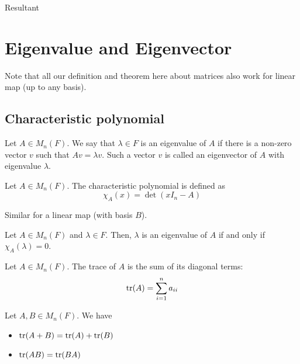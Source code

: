 \documentclass[11pt]{article}
\begin{document}
\begin{extension}{Resultant}
  
\end{extension}

\section{Eigenvalue and Eigenvector}
Note that all our definition and theorem here about matrices also work for linear map (up to any basis).
\subsection{Characteristic polynomial}
\begin{definition}
  Let \(A\in M_n(F)\). We say that \(\lambda\in F\) is an eigenvalue of \(A\) if there is a non-zero vector \(v\) such that \(Av=\lambda v\). Such a vector \(v\) is called an eigenvector of \(A\) with eigenvalue \(\lambda\).
\end{definition}

\begin{definition}
  Let \(A\in M_n(F)\). The characteristic polynomial is defined as 
  \[\chi_A(x)=\det(xI_n-A)\]
\end{definition}
Similar for a linear map (with basis \(B\)).

\begin{theorem}
  Let \(A\in M_n(F)\) and \(\lambda\in F\). Then, \(\lambda\) is an eigenvalue of \(A\) if and only if \(\chi_A(\lambda)=0\).
\end{theorem}

\begin{definition}[Trace]
  Let \(A\in M_n(F)\). The trace of \(A\) is the sum of its diagonal terms:
  \[\tr(A)=\sum_{i=1}^{n}a_{ii}\]
\end{definition}
\begin{theorem}
  Let \(A,B\in M_n(F)\). We have 
  \begin{itemize}
    \item \(\tr(A+B)=\tr(A)+\tr(B)\)
    \item \(\tr(AB)=\tr(BA)\)
  \end{itemize}
\end{theorem}
\end{document}
